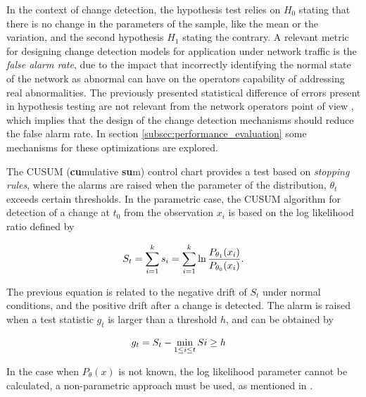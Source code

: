 \par In the context of change detection, the hypothesis test relies on $H_0$ stating that there is no change in the parameters of the sample, like the mean or the variation, and the second hypothesis $H_1$ stating the contrary.
A relevant metric for designing change detection models for application under network traffic is the \textit{false alarm rate},
due to the impact that incorrectly identifying the normal state of the network as abnormal can have on the operators capability of addressing real abnormalities. The previously presented statistical difference of errors 
present in hypothesis testing are not relevant from the network operators point of view \cite{CITE - https://www.net.in.tum.de/fileadmin/TUM/NET/NET-2010-06-1.pdf},
which implies that the design of the change detection mechanisms should reduce the false alarm rate. In section \ref{subsec:performance_evaluation} some mechanisms for these optimizations are explored.

\par The CUSUM (\textbf{cu}mulative \textbf{su}m) control chart provides a test based on \textit{stopping rules}, where the alarms are raised when the parameter of the distribution, $\theta_t$ exceeds certain thresholds. In
the parametric case, the CUSUM algorithm for detection of a change at $t_0$ from the observation $x_i$ is based on the log likelihood ratio defined by \cite {https://eprints.qut.edu.au/20572/3/ahmed2008npc.pdf}

\begin{equation*}
\centering
    S_t = \sum_{i=1}^k s_i = \sum_{i=1}^k\ln \frac {P_{\theta_1}(x_i)} {P_{\theta_0}(x_i)}.
\end{equation*}

\pagebreak

\par The previous equation is related to the negative drift of $S_t$ under normal conditions, and the positive drift after a change is detected. The alarm is raised when a test statistic $g_t$ is larger than a threshold $h$, and can be obtained by 

\begin{equation*}
\centering
    \begin{split}
        &g_t = S_t - \min_{1 \leq i \leq t} Si \geq h
    \end{split}
\end{equation*}

\par In the case when $P_{\theta}(x)$ is not known, the log likelihood parameter cannot be calculated, a non-parametric approach must be used, as mentioned in \cite{https://eprints.qut.edu.au/20572/3/ahmed2008npc.pdf}.  

